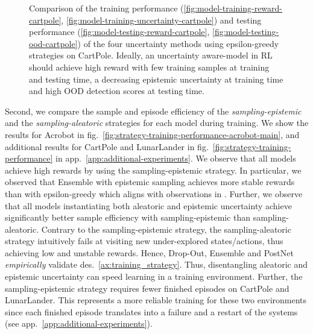 \begin{figure}
\begin{subfigure}{.23\textwidth}
    \end{subfigure}
    \caption{Comparison of the training performance (\ref{fig:model-training-reward-cartpole},  \ref{fig:model-training-uncertainty-cartpole}) and testing performance (\ref{fig:model-testing-reward-cartpole},  \ref{fig:model-testing-ood-cartpole}) of the four uncertainty methods using epsilon-greedy strategies on CartPole. Ideally, an uncertainty aware-model in RL should achieve high reward with few training samples at training and testing time, a decreasing epistemic uncertainty at training time and high OOD detection scores at testing time.}
    \label{fig:model-training-testing-performance-cartpole-main}
\end{figure}

Second, we compare the sample and episode efficiency of the \emph{sampling-epistemic} and the \emph{sampling-aleatoric} strategies for each model during training. We show the results for Acrobot in fig.~\ref{fig:strategy-training-performance-acrobot-main}, and additional results for CartPole and LunarLander in fig.~\ref{fig:strategy-training-performance} in app.~\ref{app:additional-experiments}. We observe that all models achieve high rewards by using the sampling-epistemic strategy. In particular, we observed that Ensemble with epistemic sampling achieves more stable rewards than with epsilon-greedy which aligns with observations in \citet{bootstrapped-dqn}. Further, we observe that all models instantiating both aleatoric and epistemic uncertainty achieve significantly better sample efficiency with sampling-epistemic than sampling-aleatoric. Contrary to the sampling-epistemic strategy, the sampling-aleatoric strategy intuitively fails at visiting new under-explored states/actions, thus achieving low and unstable rewards. Hence, Drop-Out, Ensemble and PostNet \emph{empirically} validate des.~\ref{ax:training_strategy}. Thus, disentangling aleatoric and epistemic uncertainty can speed learning in a training environment. Further, the sampling-epistemic strategy requires fewer finished episodes on CartPole and LunarLander. This represents a more reliable training for these two environments since each finished episode translates into a failure and a restart of the systems (see app.~\ref{app:additional-experiments}).

%

% 
%


